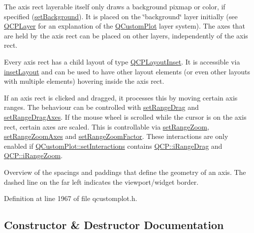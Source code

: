 The axis rect layerable itself only draws a background pixmap or color, if specified (\hyperlink{class_q_c_p_axis_rect_af615ab5e52b8e0a9a0eff415b6559db5}{set\+Background}). It is placed on the \char`\"{}background\char`\"{} layer initially (see \hyperlink{class_q_c_p_layer}{Q\+C\+P\+Layer} for an explanation of the \hyperlink{class_q_custom_plot}{Q\+Custom\+Plot} layer system). The axes that are held by the axis rect can be placed on other layers, independently of the axis rect.

Every axis rect has a child layout of type \hyperlink{class_q_c_p_layout_inset}{Q\+C\+P\+Layout\+Inset}. It is accessible via \hyperlink{class_q_c_p_axis_rect_a949f803466619924c7018df4b511ae10}{inset\+Layout} and can be used to have other layout elements (or even other layouts with multiple elements) hovering inside the axis rect.

If an axis rect is clicked and dragged, it processes this by moving certain axis ranges. The behaviour can be controlled with \hyperlink{class_q_c_p_axis_rect_ae6aef2f7211ba6097c925dcd26008418}{set\+Range\+Drag} and \hyperlink{class_q_c_p_axis_rect_a648cce336bd99daac4a5ca3e5743775d}{set\+Range\+Drag\+Axes}. If the mouse wheel is scrolled while the cursor is on the axis rect, certain axes are scaled. This is controllable via \hyperlink{class_q_c_p_axis_rect_a7960a9d222f1c31d558b064b60f86a31}{set\+Range\+Zoom}, \hyperlink{class_q_c_p_axis_rect_a9442cca2aa358405f39a64d51eca13d2}{set\+Range\+Zoom\+Axes} and \hyperlink{class_q_c_p_axis_rect_a895d7ac745ea614e04056244b3c138ac}{set\+Range\+Zoom\+Factor}. These interactions are only enabled if \hyperlink{class_q_custom_plot_a5ee1e2f6ae27419deca53e75907c27e5}{Q\+Custom\+Plot\+::set\+Interactions} contains \hyperlink{namespace_q_c_p_a2ad6bb6281c7c2d593d4277b44c2b037a2c4432b9aceafb94000be8d1b589ef18}{Q\+C\+P\+::i\+Range\+Drag} and \hyperlink{namespace_q_c_p_a2ad6bb6281c7c2d593d4277b44c2b037abee1e94353525a636aeaf0ba32b72e14}{Q\+C\+P\+::i\+Range\+Zoom}.

 \begin{center}Overview of the spacings and paddings that define the geometry of an axis. The dashed line on the far left indicates the viewport/widget border.\end{center}  

Definition at line 1967 of file qcustomplot.\+h.



\subsection{Constructor \& Destructor Documentation}
\mbox{\label{class_q_c_p_axis_rect_a60b31dece805462c1b82eea2e69ba042}} 
